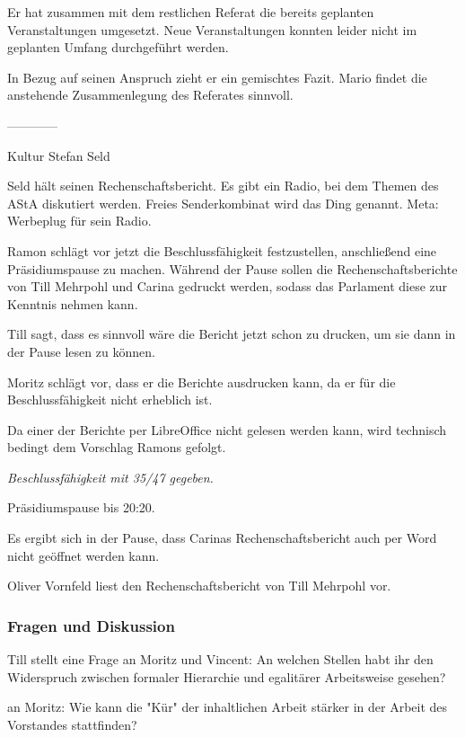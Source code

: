\documentclass[ngerman,headheight=70pt]{scrartcl}
\begin{document}
    Er hat zusammen mit dem restlichen Referat die bereits geplanten Veranstaltungen
    umgesetzt. Neue Veranstaltungen konnten leider nicht im geplanten
    Umfang durchgeführt werden.

    In Bezug auf seinen Anspruch zieht er ein gemischtes Fazit. Mario findet
    die anstehende Zusammenlegung des Referates sinnvoll.


    ------------

    Kultur
    Stefan Seld

    Seld hält seinen Rechenschaftsbericht. Es gibt ein Radio, bei dem
    Themen des AStA diskutiert werden. Freies Senderkombinat wird das Ding
    genannt. Meta: Werbeplug für sein Radio.

    Ramon schlägt vor jetzt die Beschlussfähigkeit festzustellen, anschließend
    eine Präsidiumspause zu machen. Während der Pause sollen die Rechenschaftsberichte
    von Till Mehrpohl und Carina gedruckt werden, sodass das Parlament diese
    zur Kenntnis nehmen kann.

    Till sagt, dass es sinnvoll wäre die Bericht jetzt schon zu drucken, um sie
    dann in der Pause lesen zu können.

    Moritz schlägt vor, dass er die Berichte ausdrucken kann, da er für die
    Beschlussfähigkeit nicht erheblich ist.

    Da einer der Berichte per LibreOffice nicht gelesen werden kann,
    wird technisch bedingt dem Vorschlag Ramons gefolgt.

    \textit{Beschlussfähigkeit mit 35/47 gegeben.}

    Präsidiumspause bis 20:20.

    Es ergibt sich in der Pause, dass Carinas Rechenschaftsbericht
    auch per Word nicht geöffnet werden kann.

    Oliver Vornfeld liest den Rechenschaftsbericht von Till Mehrpohl vor.

    \subsubsection{Fragen und Diskussion}

    Till stellt eine Frage an Moritz und Vincent: An welchen Stellen habt
    ihr den Widerspruch zwischen formaler Hierarchie und egalitärer
    Arbeitsweise gesehen?

    an Moritz: Wie kann die "Kür" der inhaltlichen Arbeit stärker in der
    Arbeit des Vorstandes stattfinden?
\end{document}
